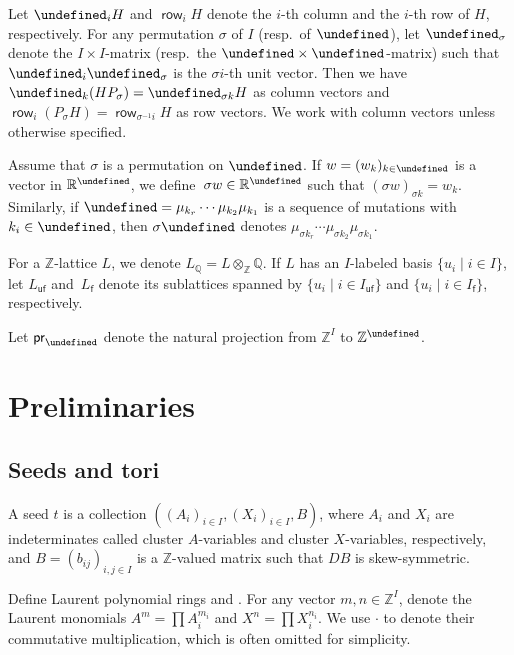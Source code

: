 \documentclass[10pt,a4paper]{amsart}
\newcommand{\kk}{\Bbbk}
\newcommand{\Z}{\mathbb{Z}}
\newcommand{\Q}{\mathbb{Q}}
\newcommand{\R}{\mathbb{R}}
\newcommand{\opname}[1]{\operatorname{\mathsf{#1}}}
\newcommand{\pr}{\opname{pr}}
\newcommand{\row}{{\mathrm{row}}}
\newcommand{\Diag}{\opname{Diag}}
\newcommand{\fv}{\opname{f}}
\newcommand{\ufv}{\opname{uf}}
\let\Iufv\undefined
\let\LP\undefined
\let\col\undefined
\let\seq\undefined
\let\trans\undefined
\newcommand{\Iufv}{I_{\ufv}}
\newcommand{\LP}{{\mathcal{LP}}}
\renewcommand{\Diag}{D}
\newcommand{\col}{\opname{col}}
\renewcommand{\row}{\opname{row}}
\newcommand{\seq}{\boldsymbol{\mu}}%
\newcommand{\trans}{\opname{P}}
\numberwithin{equation}{section}
\begin{document}
Let $\col_{i}H$ and $\row_{i}H$ denote the $i$-th column and the $i$-th
row of $H$, respectively. For any permutation $\sigma$ of $I$ (resp.\
of $\Iufv$), let $\trans_{\sigma}$ denote the $I\times I$-matrix
(resp.\ the $\Iufv\times\Iufv$-matrix) such that $\col_{i}\trans_{\sigma}$
is the $\sigma i$-th unit vector. Then we have $\col_{k}(HP_{\sigma})=\col_{\sigma k}H$ as column vectors and~$\row_{i}(P_{\sigma}H)=\row_{\sigma^{-1}i}H$ as row vectors. We work with column vectors unless otherwise specified.

Assume that $\sigma$ is a permutation on $\Iufv$. If $w=(w_k)_{k\in \Iufv}$ is a vector in $\R^{\Iufv}$, we define~$\sigma w\in \R^{\Iufv}$ such that $(\sigma w)_{\sigma k}= w_k$. Similarly, if $\seq=\mu_{k_{r}}\cdots\mu_{k_{2}}\mu_{k_{1}}$ is a sequence of
mutations with $k_i\in \Iufv$, then $\sigma\seq$
denotes $\mu_{\sigma k_{r}}\cdots\mu_{\sigma k_{2}}\mu_{\sigma k_{1}}$.

For a $\Z$-lattice $L$, we denote $L_{\Q}=L\otimes_{\Z}\Q$. If
$L$ has an $I$-labeled basis $\{u_{i}\mid i\in I\}$, let $L_{\ufv}$
and~$L_{\fv}$ denote its sublattices spanned by $\{u_{i}\mid i\in I_{\ufv}\}$
and $\{u_{i}\mid i\in I_{\fv}\}$, respectively.

Let $\pr_{\Iufv}$ denote the natural projection from $\Z^{I}$ to
$\Z^{\Iufv}$.

\section{Preliminaries}\label{sec:Preliminaries}

\subsection{Seeds and tori}

\begin{Definition}[seeds]
A seed $t$ is a collection $((A_{i})_{i\in I},(X_{i})_{i\in I},B)$,
where $A_{i}$ and $X_{i}$ are indeterminates called cluster $A$-variables
and cluster $X$-variables, respectively, and $B=(b_{ij})_{i,j\in I}$
is a $\Z$-valued matrix such that $\Diag B$ is skew-symmetric.
\end{Definition}

Define Laurent polynomial rings \smash{$\LP^{A}=\kk\big[A_{i}^{\pm}\big]_{i\in I}$}
and \smash{$\LP^{X}=\kk\big[X_{i}^{\pm}\big]_{i\in I}$}. For any vector $m,n\in\Z^{I}$,
denote the Laurent monomials $A^{m}=\prod A_{i}^{m_{i}}$ and $X^{n}=\prod X_{i}^{n_{i}}$. We use $\cdot$ to denote their commutative multiplication, which is often omitted for simplicity.
\end{document}
